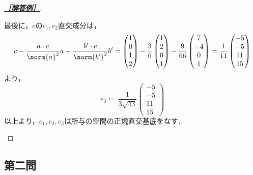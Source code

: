 \documentclass[uplatex,dvipdfmx]{jsarticle}
\begin{document}
\begin{proof}[\textbf{\underline{［解答例］}}]
\begin{enumerate}
        最後に，$c$の$e_1,e_2$直交成分は，
        \[c-\frac{a\cdot c}{\norm{a}^2}a-\frac{b'\cdot c}{\norm{b'}^2}b'=\begin{pmatrix}
            1\\0\\1\\2
        \end{pmatrix}-\frac{3}{6}\begin{pmatrix}
            1\\2\\0\\1
        \end{pmatrix}-\frac{9}{66}\begin{pmatrix}
            7\\-4\\0\\1
        \end{pmatrix}=\frac{1}{11}\begin{pmatrix}-5\\-5\\11\\15\end{pmatrix}\]
        より，
        \[e_3:=\frac{1}{3\sqrt{43}}\begin{pmatrix}-5\\-5\\11\\15\end{pmatrix}\]
        以上より，$e_1,e_2,e_3$は所与の空間の正規直交基底をなす．
    \end{enumerate}
\end{proof}

\subsection{第二問}
\end{document}
